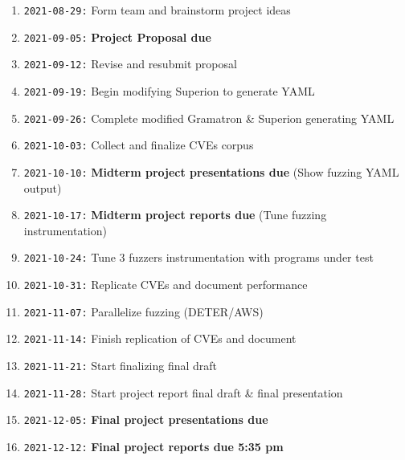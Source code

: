 \documentclass[12pt]{diazessay}
\begin{document}
\begin{enumerate}[label={}]
	\item \texttt{2021-08-29:} Form team and brainstorm project ideas
	\item \texttt{2021-09-05:} \textbf{Project Proposal due}
	\item \texttt{2021-09-12:} Revise and resubmit proposal
	\item \texttt{2021-09-19:} Begin modifying Superion to generate YAML
	\item \texttt{2021-09-26:} Complete modified Gramatron \& Superion generating YAML
	\item \texttt{2021-10-03:} Collect and finalize CVEs corpus
	\item \texttt{2021-10-10:} \textbf{Midterm project presentations due} \hfill (Show fuzzing YAML output)
	\item \texttt{2021-10-17:} \textbf{Midterm project reports due} \hfill (Tune fuzzing instrumentation)
	\item \texttt{2021-10-24:} Tune 3 fuzzers instrumentation with programs under test
	\item \texttt{2021-10-31:} Replicate CVEs and document performance
	\item \texttt{2021-11-07:} Parallelize fuzzing \hfill (DETER/AWS)
	\item \texttt{2021-11-14:} Finish replication of CVEs and document
	\item \texttt{2021-11-21:} Start finalizing final draft
	\item \texttt{2021-11-28:} Start project report final draft \& final presentation
	\item \texttt{2021-12-05:} \textbf{Final project presentations due}
	\item \texttt{2021-12-12:} \textbf{Final project reports due 5:35 pm}
\end{enumerate}


\clearpage


\end{document}

